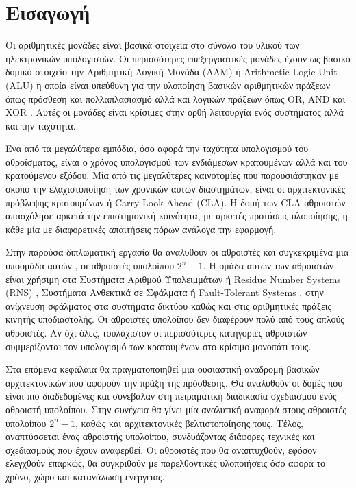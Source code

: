
\section{Εισαγωγή}

Οι αριθμητικές μονάδες είναι βασικά στοιχεία στο σύνολο του υλικού των ηλεκτρονικών υπολογιστών. Οι περισσότερες επεξεργαστικές μονάδες έχουν ως βασικό δομικό στοιχείο την Αριθμητική Λογική Μονάδα (ΑΛΜ) ή Arithmetic Logic Unit (ALU) η οποία είναι υπεύθυνη για την υλοποίηση βασικών αριθμητικών πράξεων όπως πρόσθεση και πολλαπλασιασμό αλλά και λογικών πράξεων όπως OR, AND και XOR . Αυτές οι μονάδες είναι κρίσιμες στην ορθή λειτουργία ενός συστήματος αλλά και την ταχύτητα.

Ένα από τα μεγαλύτερα εμπόδια, όσο αφορά την ταχύτητα υπολογισμού του αθροίσματος, είναι ο 
χρόνος υπολογισμού των ενδιάμεσων κρατουμένων αλλά και του κρατούμενου εξόδου. Μία από τις
μεγαλύτερες καινοτομίες που παρουσιάστηκαν με σκοπό την ελαχιστοποίηση των χρονικών αυτών 
διαστημάτων, είναι οι αρχιτεκτονικές πρόβλεψης κρατουμένων ή Carry Look Ahead (CLA). Η δομή των CLA αθροιστών 
απασχόλησε αρκετά την επιστημονική κοινότητα, με αρκετές προτάσεις υλοποίησης, η κάθε μία
με διαφορετικές απαιτήσεις πόρων ανάλογα την εφαρμογή.


Στην παρούσα διπλωματική εργασία θα αναλυθούν οι αθροιστές και συγκεκριμένα μια υποομάδα αυτών , οι αθροιστές υπολοίπου $2^n-1$. Η ομάδα αυτών των αθροιστών είναι χρήσιμη στα Συστήματα Αριθμού Υπολειμμάτων ή Residue Number Systems (RNS) , Συστήματα Ανθεκτικά σε Σφάλματα ή Fault-Tolerant Systems , στην ανίχνευση σφάλματος στα συστήματα δικτύου καθώς και στις αριθμητικές πράξεις κινητής υποδιαστολής. Οι αθροιστές υπολοίπου δεν διαφέρουν πολύ από τους απλούς αθροιστές.
Αν όχι όλες, τουλάχιστον οι περισσότερες κατηγορίες αθροιστών συμμερίζονται τον υπολογισμό
των κρατουμένων στο κρίσιμο μονοπάτι τους.

Στα επόμενα κεφάλαια θα πραγματοποιηθεί μια ουσιαστική αναδρομή βασικών αρχιτεκτονικών 
που αφορούν την πράξη της πρόσθεσης. Θα αναλυθούν οι δομές που είναι πιο διαδεδομένες και
συνέβαλαν στη πειραματική διαδικασία σχεδιασμού ενός αθροιστή υπολοίπου. Στην συνέχεια 
θα γίνει μία αναλυτική αναφορά στους αθροιστές υπολοίπου $2^n-1$, καθώς και αρχιτεκτονικές
βελτιστοποίησης τους. Τέλος, αναπτύσσεται ένας αθροιστής υπολοίπου, συνδυάζοντας διάφορες 
τεχνικές και σχεδιασμούς που έχουν αναφερθεί. Οι αθροιστές που θα αναπτυχθούν, εφόσον ελεγχθούν επαρκώς, θα συγκριθούν με παρελθοντικές υλοποιήσεις όσο αφορά το χρόνο, χώρο και κατανάλωση ενέργειας.

